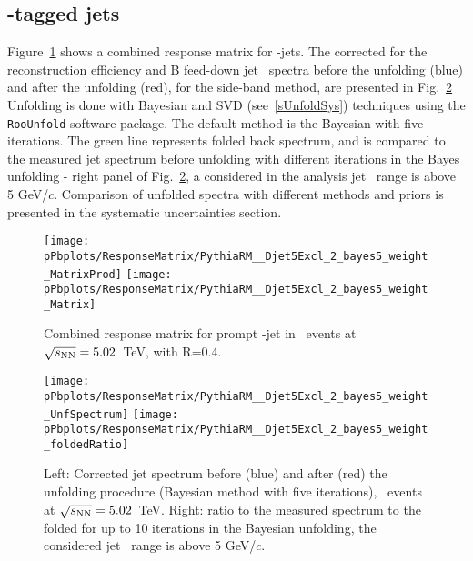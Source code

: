 \subsection{\Dstar-tagged jets}
Figure~\ref{fig:pPb_ResponseMatrix} shows a combined response matrix for \Dstar-jets.
The corrected for the reconstruction efficiency and B feed-down jet \pt\ spectra before the unfolding (blue) and after the unfolding (red), for the side-band method, are presented in Fig.~\ref{fig:UnfSpec_pPb}
Unfolding is done with Bayesian and SVD (see~\ref{sUnfoldSys}) techniques using the \texttt{RooUnfold} software package. The default method is the Bayesian with five iterations. The green line represents folded back spectrum, and is compared to the measured jet spectrum before unfolding with different iterations in the Bayes unfolding - right panel of Fig.~\ref{fig:UnfSpec_pPb}, a considered in the analysis jet \pt\ range is above 5 GeV/$c$.
Comparison of unfolded spectra with different methods and priors is presented in the systematic uncertainties section. 

\begin{figure}[bth]
\centering
\texttt{[image: pPbplots/ResponseMatrix/PythiaRM\_\_Djet5Excl\_2\_bayes5\_weight\_MatrixProd]}
\texttt{[image: pPbplots/ResponseMatrix/PythiaRM\_\_Djet5Excl\_2\_bayes5\_weight\_Matrix]}
\caption{Combined response matrix for prompt \Dstar-jet in \pPb\ events at $\sqrt{s_{\rm NN}}=5.02$~TeV, with R=0.4.}
\label{fig:pPb_ResponseMatrix}
\end{figure}

\begin{figure}[bth]
\centering
\texttt{[image: pPbplots/ResponseMatrix/PythiaRM\_\_Djet5Excl\_2\_bayes5\_weight\_UnfSpectrum]}
\texttt{[image: pPbplots/ResponseMatrix/PythiaRM\_\_Djet5Excl\_2\_bayes5\_weight\_foldedRatio]}
\caption{Left: Corrected jet \pt spectrum before (blue) and after (red) the unfolding procedure (Bayesian method with five iterations), \pPb\ events at $\sqrt{s_{\rm NN}}=5.02$~TeV. Right: ratio to the measured spectrum to the folded for up to 10 iterations in the Bayesian unfolding, the considered jet \pt\ range is above 5 GeV/$c$.}
\label{fig:UnfSpec_pPb}
\end{figure}

